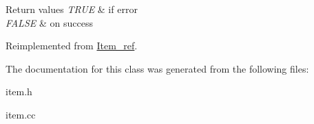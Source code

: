 \begin{DoxyRetVals}{Return values}
{\em T\+R\+UE} & if error \\
\hline
{\em F\+A\+L\+SE} & on success \\
\hline
\end{DoxyRetVals}


Reimplemented from \mbox{\hyperlink{classItem__ref_a6a78e05b0db89e799f61808c621b808f}{Item\+\_\+ref}}.



The documentation for this class was generated from the following files\+:\begin{DoxyCompactItemize}
\item 
item.\+h\item 
item.\+cc\end{DoxyCompactItemize}
